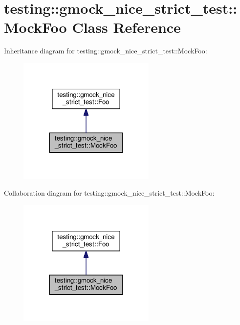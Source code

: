 \hypertarget{classtesting_1_1gmock__nice__strict__test_1_1MockFoo}{}\section{testing\+:\+:gmock\+\_\+nice\+\_\+strict\+\_\+test\+:\+:Mock\+Foo Class Reference}
\label{classtesting_1_1gmock__nice__strict__test_1_1MockFoo}


Inheritance diagram for testing\+:\+:gmock\+\_\+nice\+\_\+strict\+\_\+test\+:\+:Mock\+Foo\+:\nopagebreak
\begin{figure}[H]
\begin{center}
\leavevmode
\includegraphics[width=192pt]{classtesting_1_1gmock__nice__strict__test_1_1MockFoo__inherit__graph}
\end{center}
\end{figure}


Collaboration diagram for testing\+:\+:gmock\+\_\+nice\+\_\+strict\+\_\+test\+:\+:Mock\+Foo\+:\nopagebreak
\begin{figure}[H]
\begin{center}
\leavevmode
\includegraphics[width=192pt]{classtesting_1_1gmock__nice__strict__test_1_1MockFoo__coll__graph}
\end{center}
\end{figure}
